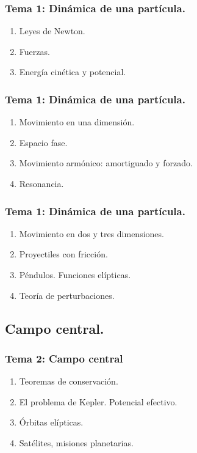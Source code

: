 \documentclass[12pt]{beamer}
\begin{document}
\begin{frame}
\frametitle{\textbf{Tema 1: Dinámica de una partícula.}}
\begin{enumerate}[<+->]
\item Leyes de Newton.
\item Fuerzas.
\item Energía cinética y potencial.
\seti
\end{enumerate}
\end{frame}
\begin{frame}
\frametitle{\textbf{Tema 1: Dinámica de una partícula.}}
\begin{enumerate}[<+->]
\conti
\item Movimiento en una dimensión.
\item Espacio fase.
\item Movimiento armónico: amortiguado y forzado.
\item Resonancia. 
\seti
\end{enumerate}
\end{frame}
\begin{frame}
\frametitle{\textbf{Tema 1: Dinámica de una partícula.}}
\begin{enumerate}[<+->]
\conti
\item Movimiento en dos y tres dimensiones.
\item Proyectiles con fricción.
\item Péndulos. Funciones elípticas.
\item Teoría de perturbaciones.
\seti
\end{enumerate}
\end{frame}

\subsection{Campo central.}

\begin{frame}
\frametitle{\textbf{Tema 2: Campo central}}
\begin{enumerate}[<+->]
\item Teoremas de conservación.
\item El problema de Kepler. Potencial efectivo.
\item Órbitas elípticas.
\item Satélites, misiones planetarias.
\end{enumerate}
\end{frame}
\end{document}
